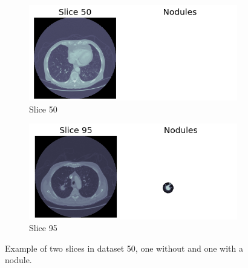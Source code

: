 \begin{figure}[ht]
\begin{center}
	\begin{subfigure}[b]{\linewidth}
		\includegraphics[width=\linewidth]{img/cascades/D50S50.png}
		\caption{Slice 50}
	\end{subfigure}
	\begin{subfigure}[b]{\linewidth}
		\includegraphics[width=\linewidth]{img/cascades/D50S95.png}
  		\caption{Slice 95}
	\end{subfigure}
	\caption{Example of two slices in dataset 50, one without and one with a
	nodule.}
	\label{fig:d50}
\end{center}
\end{figure}


